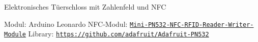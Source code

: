 Elektronisches Tüerschloss mit Zahlenfeld und N\+FC

Modul\+: Arduino Leonardo N\+F\+C-\/\+Modul\+: \href{http://www.aliexpress.com/item/Mini-PN532-NFC-RFID-Reader-Writer-Module-For-Arduino-Android-Phone/2038722238.html}{\tt Mini-\/\+P\+N532-\/\+N\+F\+C-\/\+R\+F\+I\+D-\/\+Reader-\/\+Writer-\/\+Module} Library\+: \href{https://github.com/adafruit/Adafruit-PN532}{\tt https\+://github.\+com/adafruit/\+Adafruit-\/\+P\+N532} 